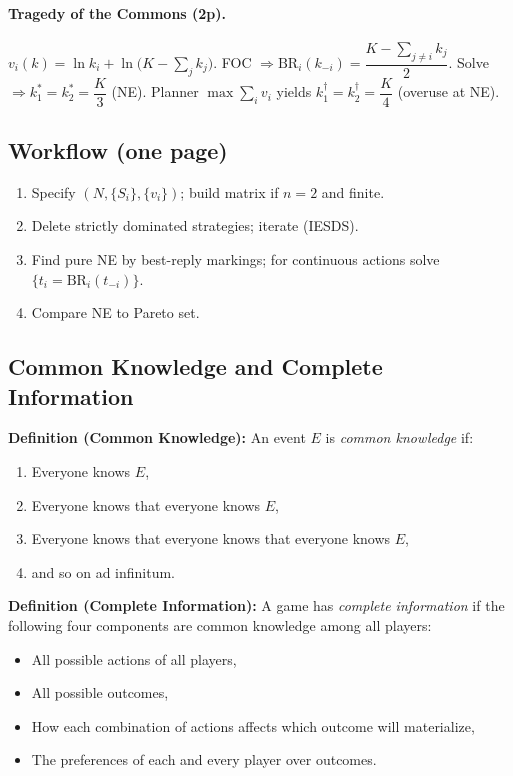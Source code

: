 \documentclass[9pt]{article}
\newcommand{\Players}{N}
\newcommand{\vi}{v_i}
\newcommand{\BR}{\mathrm{BR}}
\begin{document}
\paragraph{Tragedy of the Commons (2p).} $v_i(k)=\ln k_i+\ln\!\big(K-\sum_j k_j\big)$.
FOC $\Rightarrow \BR_i(k_{-i})=\dfrac{K-\sum_{j\ne i}k_j}{2}$.
Solve $\Rightarrow k_1^*=k_2^*=\dfrac{K}{3}$ (NE). Planner $\max \sum_i v_i$ yields $k_1^\dagger=k_2^\dagger=\dfrac{K}{4}$ (overuse at NE).

\subsection*{Workflow (one page)}
\begin{enumerate}[leftmargin=*,itemsep=1pt,topsep=2pt]
  \item Specify $(\Players,\{S_i\},\{\vi\})$; build matrix if $n=2$ and finite.
  \item Delete strictly dominated strategies; iterate (IESDS).
  \item Find pure NE by best-reply markings; for continuous actions solve $\{t_i=\BR_i(t_{-i})\}$.
  \item Compare NE to Pareto set.
\end{enumerate}

  \subsection*{Common Knowledge and Complete Information}

  \textbf{Definition (Common Knowledge):} An event $E$ is \emph{common knowledge} if:
  \begin{enumerate}[label=\arabic*)]
    \item Everyone knows $E$,
    \item Everyone knows that everyone knows $E$,
    \item Everyone knows that everyone knows that everyone knows $E$,
    \item and so on ad infinitum.
  \end{enumerate}

  \textbf{Definition (Complete Information):} A game has \emph{complete information} if the following four components are common knowledge among all players:
  \begin{itemize}
    \item All possible actions of all players,
    \item All possible outcomes,
    \item How each combination of actions affects which outcome will materialize,
    \item The preferences of each and every player over outcomes.
  \end{itemize}
\end{document}
